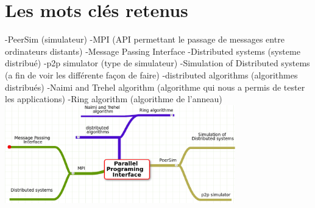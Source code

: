 \documentclass{article}
\begin{document}
		\section{Les mots clés retenus}
		-PeerSim (simulateur)
		\newline
		\newline
		-MPI (API permettant le passage de messages entre ordinateurs distants)
		\newline
		\newline
		-Message Passing Interface
		\newline
		\newline
		-Distributed systems (systeme distribué)
		\newline
		\newline
		-p2p simulator (type de simulateur)
		\newline
		\newline
		-Simulation of Distributed systems (a fin de voir les différente façon de faire)
		\newline
		\newline
		-distributed algorithms (algorithmes distribués)
		\newline
		\newline
		-Naimi and Trehel algorithm (algorithme qui nous a permis de tester les applications)
		\newline
		\newline
		-Ring algorithm (algorithme de l'anneau)
		\newline
		\newline
		\newline
		\newline
		\newline
		\newline
		\newline
		\newline
		\newline 
		\includegraphics[width=10cm]{mindmap.png}
		\newpage		
\end{document}
